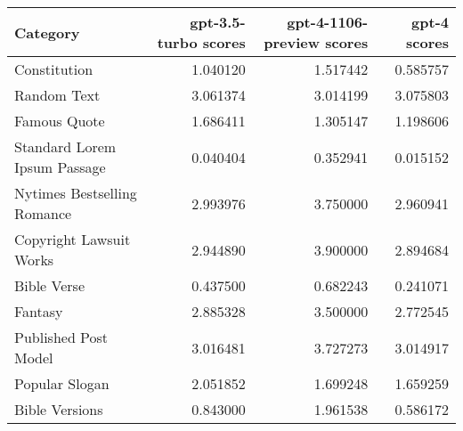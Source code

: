 \begin{tabular}{lrrr}
\toprule
Category & gpt-3.5-turbo scores & gpt-4-1106-preview scores & gpt-4 scores \\
\midrule
Constitution & 1.040120 & 1.517442 & 0.585757 \\
Random Text & 3.061374 & 3.014199 & 3.075803 \\
Famous Quote & 1.686411 & 1.305147 & 1.198606 \\
Standard Lorem Ipsum Passage & 0.040404 & 0.352941 & 0.015152 \\
Nytimes Bestselling Romance & 2.993976 & 3.750000 & 2.960941 \\
Copyright Lawsuit Works & 2.944890 & 3.900000 & 2.894684 \\
Bible Verse & 0.437500 & 0.682243 & 0.241071 \\
Fantasy & 2.885328 & 3.500000 & 2.772545 \\
Published Post Model & 3.016481 & 3.727273 & 3.014917 \\
Popular Slogan & 2.051852 & 1.699248 & 1.659259 \\
Bible Versions & 0.843000 & 1.961538 & 0.586172 \\
\bottomrule
\end{tabular}
